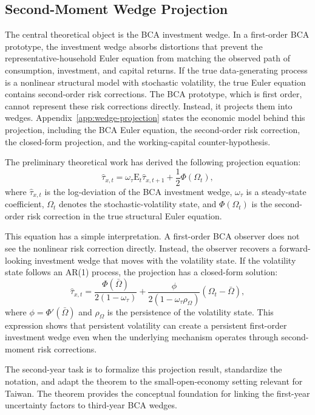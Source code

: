 \documentclass[12pt]{article}
\begin{document}
\subsection{Second-Moment Wedge Projection}

The central theoretical object is the BCA investment wedge. In a first-order BCA prototype, the
investment wedge absorbs distortions that prevent the representative-household Euler equation
from matching the observed path of consumption, investment, and capital returns. If the true
data-generating process is a nonlinear structural model with stochastic volatility, the true Euler
equation contains second-order risk corrections. The BCA prototype, which is first order, cannot
represent these risk corrections directly. Instead, it projects them into wedges. Appendix~\ref{app:wedge-projection}
states the economic model behind this projection, including the BCA Euler equation, the
second-order risk correction, the closed-form projection, and the working-capital counter-hypothesis.

The preliminary theoretical work has derived the following projection equation:
\[
\hat{\tau}_{x,t}
=
\omega_\tau \mathrm{E}_t\hat{\tau}_{x,t+1}
+
\frac{1}{2}\Phi(\Omega_t),
\]
where $\hat{\tau}_{x,t}$ is the log-deviation of the BCA investment wedge,
$\omega_\tau$ is a steady-state coefficient, $\Omega_t$ denotes the stochastic-volatility state,
and $\Phi(\Omega_t)$ is the second-order risk correction in the true structural Euler equation.

This equation has a simple interpretation. A first-order BCA observer does not see the nonlinear
risk correction directly. Instead, the observer recovers a forward-looking investment wedge that
moves with the volatility state. If the volatility state follows an AR(1) process, the projection has
a closed-form solution:
\[
\hat{\tau}_{x,t}
=
\frac{\Phi(\bar{\Omega})}{2(1-\omega_\tau)}
+
\frac{\phi}{2(1-\omega_\tau\rho_\Omega)}
(\Omega_t-\bar{\Omega}),
\]
where $\phi=\Phi'(\bar{\Omega})$ and $\rho_\Omega$ is the persistence of the volatility state.
This expression shows that persistent volatility can create a persistent first-order investment
wedge even when the underlying mechanism operates through second-moment risk corrections.

The second-year task is to formalize this projection result, standardize the notation, and adapt
the theorem to the small-open-economy setting relevant for Taiwan. The theorem provides the
conceptual foundation for linking the first-year uncertainty factors to third-year BCA wedges.
\end{document}

